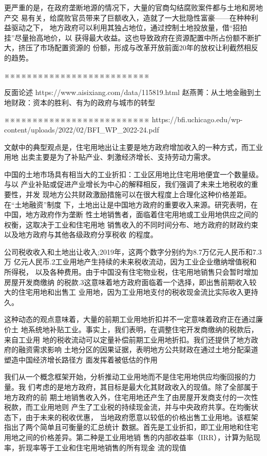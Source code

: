 更严重的是，在政府垄断地源的情况下，大量的官商勾结腐败案件都与土地和房地产交
易有关，给腐败官员带来了巨额收入，造就了一大批隐性富豪——在种种利益驱动之下，
地方政府可以利用其独占地位，通过控制土地投放量，借“招拍挂”尽量抬高地价，以
获得最大收益。这也导致政府在资源配置中所占份额不断扩大，挤压了市场配置资源的
份额，形成与改革开放前面20年的放权让利截然相反的趋势。

※※※※※※※※※※※※※※※※※※※※※※※※※※


反面论述
https://www.aisixiang.com/data/115819.html
赵燕菁：从土地金融到土地财政：资本的胜利、有为的政府与城市的转型

※※※※※※※※※※※※※※※※※※※※※※※※※※
https://bfi.uchicago.edu/wp-content/uploads/2022/02/BFI_WP_2022-24.pdf

文献中的典型观点是，住宅用地出让主要是地方政府增加收入的一种方式，而工业用地
出卖主要是为了补贴产业、刺激经济增长、支持劳动力需求。

中国的土地市场具有相当大的工业折扣：工业区用地比住宅用地便宜一个数量级。与以
产业补贴或促进产业增长为中心的解释相反，我们强调了未来土地税收的重要性，并发
现地方公共财政激励措施可以在很大程度上合理化这种价格差距。在“土地融资”制度
下，土地出让是中国地方政府的重要收入来源。研究表明，在中国，地方政府作为垄断
性土地销售者，面临着住宅用地或工业用地供应之间的权衡，这取决于工业和住宅用地
销售收入的不同时间分布、地方政府的财政约束以及地方政府与其他各级政府分享税收
的程度。

公司税收收入和土地出让收入;2019年，这两个数字分别约为8.7万亿元人民币和7.3万
亿元人民币.2工业用地产生持续的未来税收流动，因为工业企业缴纳增值税和所得税，
以及各种费用。由于中国没有住宅物业税，住宅用地销售只会暂时增加房屋开发商缴纳
的税款.3这意味着地方政府面临着一个选择，即出售前期收入较大的住宅用地和出售工
业用地，因为工业用地支付的税收现金流比实际收入更持久。

这种动态的观点意味着，大量的前期工业用地折扣并不一定意味着政府正在通过廉价土
地系统地补贴工业。事实上，我们表明，在调整住宅开发商缴纳的税款后，来自工业用
地的税收流动可以定量补偿前期工业用地折扣。我们还提供了地方政府的融资需求影响
土地分区的因果证据，表明地方公共财政在通过土地分配渠道塑造中国经济增长路径方
面发挥着被低估的作用

我们从一个概念框架开始，分析推动工业用地而不是住宅用地供应均衡回报的力量。我
们考虑的是地方政府，其目标是最大化其财政收入的现值。除了全部属于地方政府的前
期土地销售收入外，住宅用地还产生了由房屋开发商支付的一次性税款，而工业用地则
产生了工业税的持续现金流，并与中央政府共享。在均衡状态下，由于未来的税收优惠，
当地政府愿意以较低的价格出售工业用地。该框架指出了两个简单且可衡量的汇总统计
数据。首先是工业折扣，即工业用地和住宅用地之间的价格差异。第二种是工业用地销
售的内部收益率（IRR），计算为贴现率，折现率等于工业和住宅用地销售的所有现金
流的现值

